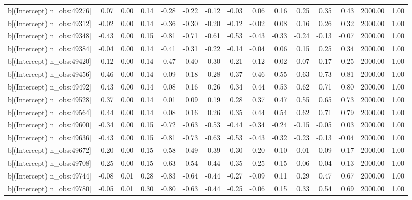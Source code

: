 \begin{table}[ht]
\begin{tabular}{rrrrrrrrrrrrrrr}
  b[(Intercept) n\_obs:49276] & 0.07 & 0.00 & 0.14 & -0.28 & -0.22 & -0.12 & -0.03 & 0.06 & 0.16 & 0.25 & 0.35 & 0.43 & 2000.00 & 1.00 \\ 
  b[(Intercept) n\_obs:49312] & -0.02 & 0.00 & 0.14 & -0.36 & -0.30 & -0.20 & -0.12 & -0.02 & 0.08 & 0.16 & 0.26 & 0.32 & 2000.00 & 1.00 \\ 
  b[(Intercept) n\_obs:49348] & -0.43 & 0.00 & 0.15 & -0.81 & -0.71 & -0.61 & -0.53 & -0.43 & -0.33 & -0.24 & -0.13 & -0.07 & 2000.00 & 1.00 \\ 
  b[(Intercept) n\_obs:49384] & -0.04 & 0.00 & 0.14 & -0.41 & -0.31 & -0.22 & -0.14 & -0.04 & 0.06 & 0.15 & 0.25 & 0.34 & 2000.00 & 1.00 \\ 
  b[(Intercept) n\_obs:49420] & -0.12 & 0.00 & 0.14 & -0.47 & -0.40 & -0.30 & -0.21 & -0.12 & -0.02 & 0.07 & 0.17 & 0.25 & 2000.00 & 1.00 \\ 
  b[(Intercept) n\_obs:49456] & 0.46 & 0.00 & 0.14 & 0.09 & 0.18 & 0.28 & 0.37 & 0.46 & 0.55 & 0.63 & 0.73 & 0.81 & 2000.00 & 1.00 \\ 
  b[(Intercept) n\_obs:49492] & 0.43 & 0.00 & 0.14 & 0.08 & 0.16 & 0.26 & 0.34 & 0.44 & 0.53 & 0.62 & 0.71 & 0.80 & 2000.00 & 1.00 \\ 
  b[(Intercept) n\_obs:49528] & 0.37 & 0.00 & 0.14 & 0.01 & 0.09 & 0.19 & 0.28 & 0.37 & 0.47 & 0.55 & 0.65 & 0.73 & 2000.00 & 1.00 \\ 
  b[(Intercept) n\_obs:49564] & 0.44 & 0.00 & 0.14 & 0.08 & 0.16 & 0.26 & 0.35 & 0.44 & 0.54 & 0.62 & 0.71 & 0.79 & 2000.00 & 1.00 \\ 
  b[(Intercept) n\_obs:49600] & -0.34 & 0.00 & 0.15 & -0.72 & -0.63 & -0.53 & -0.44 & -0.34 & -0.24 & -0.15 & -0.05 & 0.03 & 2000.00 & 1.00 \\ 
  b[(Intercept) n\_obs:49636] & -0.43 & 0.00 & 0.15 & -0.81 & -0.73 & -0.63 & -0.53 & -0.43 & -0.32 & -0.23 & -0.13 & -0.04 & 2000.00 & 1.00 \\ 
  b[(Intercept) n\_obs:49672] & -0.20 & 0.00 & 0.15 & -0.58 & -0.49 & -0.39 & -0.30 & -0.20 & -0.10 & -0.01 & 0.09 & 0.17 & 2000.00 & 1.00 \\ 
  b[(Intercept) n\_obs:49708] & -0.25 & 0.00 & 0.15 & -0.63 & -0.54 & -0.44 & -0.35 & -0.25 & -0.15 & -0.06 & 0.04 & 0.13 & 2000.00 & 1.00 \\ 
  b[(Intercept) n\_obs:49744] & -0.08 & 0.01 & 0.28 & -0.83 & -0.64 & -0.44 & -0.27 & -0.09 & 0.11 & 0.29 & 0.47 & 0.67 & 2000.00 & 1.00 \\ 
  b[(Intercept) n\_obs:49780] & -0.05 & 0.01 & 0.30 & -0.80 & -0.63 & -0.44 & -0.25 & -0.06 & 0.15 & 0.33 & 0.54 & 0.69 & 2000.00 & 1.00 \\ 

\end{tabular}
\end{table}
